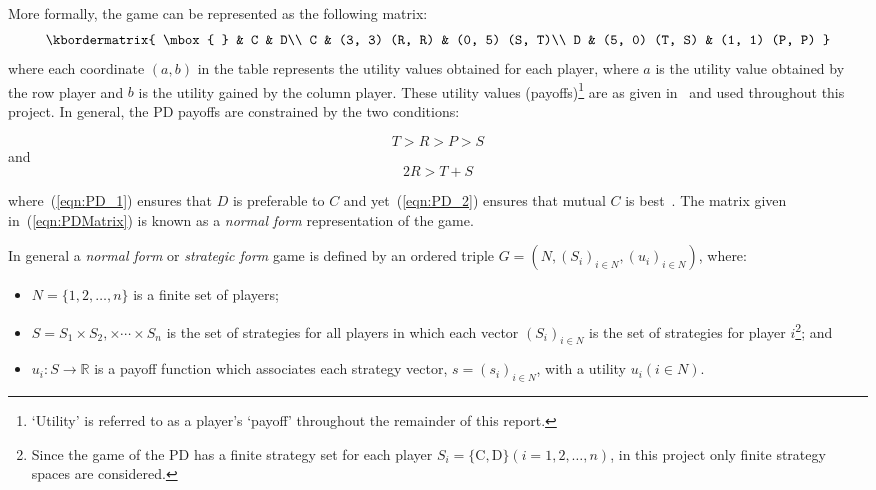 More formally, the game can be represented as the following matrix:
\begin{equation}\label{eqn:PDMatrix}
    \kbordermatrix{
        \mbox{ } & C & D\\ 
        C & (3, 3) (R, R) & (0, 5) (S, T)\\ 
        D & (5, 0) (T, S) & (1, 1) (P, P)
    }
\end{equation}
where each coordinate \((a, b)\) in the table represents the utility values
obtained for each player, where \(a\) is the utility value obtained by the row
player and \(b\) is the utility gained by the column player. These utility
values (payoffs)\footnote{`Utility' is referred to as a player's `payoff'
throughout the remainder of this report.} are as given
in~\cite{axelrod1980effective} and
used throughout this project. In general, the PD payoffs are constrained by the
two conditions:

\begin{equation}\label{eqn:PD_1}
    T > R > P > S
\end{equation}
and
\begin{equation}\label{eqn:PD_2}
    2R > T + S
\end{equation}

where~(\ref{eqn:PD_1}) ensures that \(D\) is preferable to \(C\) and
yet~(\ref{eqn:PD_2}) ensures that mutual \(C\) is
best~\cite{Knight2019,Press2012}. The matrix given in~(\ref{eqn:PDMatrix}) is
known as a \textit{normal form} representation of the game.

\begin{definition}
    In general a \textit{normal form} or \textit{strategic form} game is defined
    by an ordered triple \(G = (N, {(S_i)}_{i \in N}, {(u_i)}_{i \in N})\), where:
    \begin{itemize}
        \item \(N = \{1, 2,\ldots, n\} \) is a finite set of players;
        \item \(S = S_1 \times S_2, \times \cdots \times S_n\) is the set of
        strategies for all players in which each vector \({(S_i)}_{i \in N}\) is
        the set of strategies for player \(i\)\footnote{Since the game of the PD has a finite strategy set for each player \(S_i=\{\text{C},
        \text{D}\} (i = 1, 2, \ldots, n)\), in this project only finite
        strategy spaces are considered.}; and
        \item \(u_i : S \to \mathbb{R}\) is a payoff function which associates each
        strategy vector, \(s = {(s_i)}_{i \in N}\), with a utility
        \(u_i(i \in N)\).
    \end{itemize}
\end{definition}

